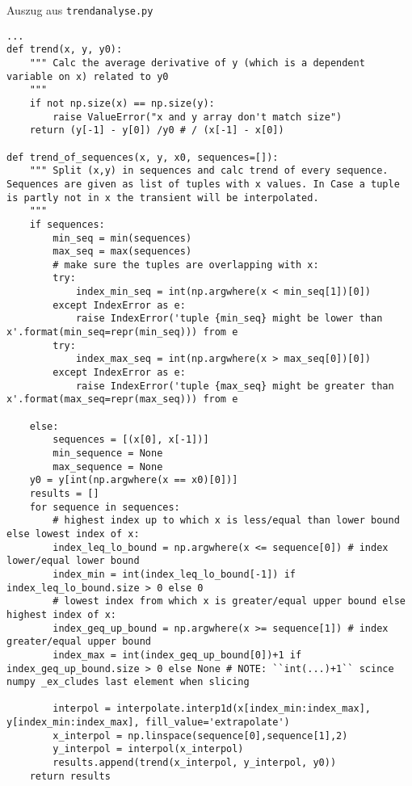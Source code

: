 \begingroup
\captionsetup{type=listing}
\caption{Auszug aus \texttt{trendanalyse.py}\label{lst:Trendanalyse}}
\begin{verbatim}
...
def trend(x, y, y0):
    """ Calc the average derivative of y (which is a dependent variable on x) related to y0
    """
    if not np.size(x) == np.size(y):
        raise ValueError("x and y array don't match size")
    return (y[-1] - y[0]) /y0 # / (x[-1] - x[0])

def trend_of_sequences(x, y, x0, sequences=[]):
    """ Split (x,y) in sequences and calc trend of every sequence. Sequences are given as list of tuples with x values. In Case a tuple is partly not in x the transient will be interpolated. 
    """
    if sequences:
        min_seq = min(sequences)
        max_seq = max(sequences)
        # make sure the tuples are overlapping with x:
        try:
            index_min_seq = int(np.argwhere(x < min_seq[1])[0])
        except IndexError as e:
            raise IndexError('tuple {min_seq} might be lower than x'.format(min_seq=repr(min_seq))) from e
        try:
            index_max_seq = int(np.argwhere(x > max_seq[0])[0])
        except IndexError as e:
            raise IndexError('tuple {max_seq} might be greater than x'.format(max_seq=repr(max_seq))) from e

    else:
        sequences = [(x[0], x[-1])]
        min_sequence = None
        max_sequence = None
    y0 = y[int(np.argwhere(x == x0)[0])]
    results = []
    for sequence in sequences:
        # highest index up to which x is less/equal than lower bound else lowest index of x:
        index_leq_lo_bound = np.argwhere(x <= sequence[0]) # index lower/equal lower bound
        index_min = int(index_leq_lo_bound[-1]) if index_leq_lo_bound.size > 0 else 0
        # lowest index from which x is greater/equal upper bound else highest index of x:
        index_geq_up_bound = np.argwhere(x >= sequence[1]) # index greater/equal upper bound
        index_max = int(index_geq_up_bound[0])+1 if index_geq_up_bound.size > 0 else None # NOTE: ``int(...)+1`` scince numpy _ex_cludes last element when slicing 
        
        interpol = interpolate.interp1d(x[index_min:index_max], y[index_min:index_max], fill_value='extrapolate')
        x_interpol = np.linspace(sequence[0],sequence[1],2)
        y_interpol = interpol(x_interpol)
        results.append(trend(x_interpol, y_interpol, y0))
    return results
\end{verbatim}
\endgroup

